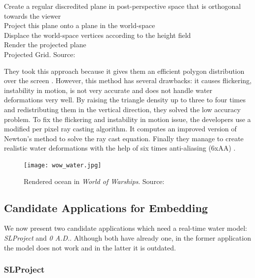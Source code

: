 \begin{algorithm}
    \small
    \DontPrintSemicolon{}
    Create a regular discredited plane in post-perspective space that is
    orthogonal towards the viewer\\
    Project this plane onto a plane in the world-space\\
    Displace the world-space vertices according to the height field\\
    Render the projected plane\\
    \caption{\small{Projected Grid. Source:
    \autocite{claes2004real}}}\label{algo:projected_grid}
\end{algorithm}

They took this approach because it gives them an efficient polygon distribution
over the screen \autocite{kryachko2016sea}. However, this method has several
drawbacks: it causes flickering, instability in motion, is not very accurate and
does not handle water deformations very well. By raising the triangle density up
to three to four times and redistributing them in the vertical direction, they
solved the low accuracy problem. To fix the flickering and instability in motion
issue, the developers use a modified per pixel ray casting algorithm. It
computes an improved version of Newton's method to solve the ray cast equation.
Finally they manage to create realistic water deformations with the help of six
times anti-aliasing (6xAA) \autocite{kryachko2016sea}.

\begin{figure}[ht]
    \centering
    \texttt{[image: wow\_water.jpg]}
    \caption{Rendered ocean in \textit{World of Warships}. Source:
    \autocite{kryachko2016sea}}\label{fig:wow_sea}
\end{figure}


\subsection{Candidate Applications for Embedding}\label{subsec:candidate_apps}

We now present two candidate applications which need a real-time water model:
\textit{SLProject} and \textit{0 A.D.}. Although both have already one,
in the former application the model does not work and in the latter it is
outdated.


\subsubsection{SLProject}

